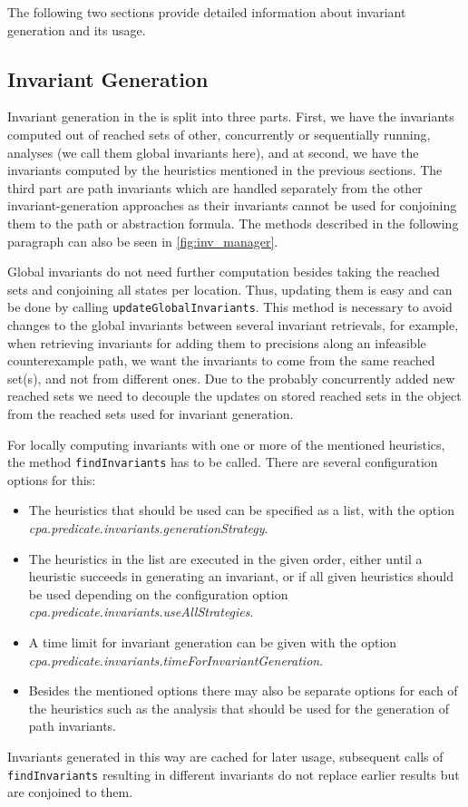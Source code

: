 The following two sections provide detailed information about invariant generation and its usage.

\subsection{Invariant Generation}
Invariant generation in the \PredicateCPA{} is split into three parts. First, we have the invariants computed out of reached sets of other, concurrently or sequentially running, analyses (we call 
them global invariants here), and at second, we have the invariants computed by the heuristics mentioned in the previous sections. The third part are path invariants which are handled separately 
from the other invariant-generation approaches as their invariants cannot be used for conjoining them to the path or abstraction formula. The methods described in the following paragraph can also be 
seen in \autoref{fig:inv_manager}.

Global invariants do not need further computation besides taking the reached sets and conjoining all states per location. Thus, updating them is easy and can be done by calling 
\texttt{updateGlobalInvariants}. This method is necessary to avoid changes to the global invariants between several invariant retrievals, for example, when retrieving invariants for adding them to 
precisions along an infeasible counterexample path, we want the invariants to come from the same reached set(s), and not from different ones. Due to the probably concurrently added new reached sets we 
need to decouple the updates on stored reached sets in the \AggregatedReachedSets{} object from the reached sets used for invariant generation.

For locally computing invariants with one or more of the mentioned heuristics, the method \texttt{findInvariants} has to be called. There are several configuration options for this:
\begin{itemize}
 \item The heuristics that should be used can be specified as a list, with the option \emph{cpa.predicate.invariants.generationStrategy}.
 \item The heuristics in the list are executed in the given order, either until a heuristic succeeds in generating an invariant, or if all given heuristics should be used depending on 	
  the configuration option \emph{cpa.predicate.invariants.useAllStrategies}.
 \item A time limit for invariant generation can be given with the option \emph{cpa.predicate.invariants.timeForInvariantGeneration}.
 \item Besides the mentioned options there may also be separate options for each of the heuristics such as the analysis that should be used for the generation of path invariants.
\end{itemize}
Invariants generated in this way are cached for later usage, subsequent calls of \texttt{findInvariants} resulting in different invariants do not replace earlier results but are conjoined to them.


